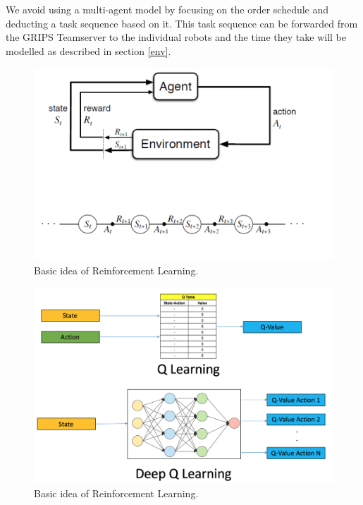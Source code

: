 \documentclass[runningheads,envcountsect]{llncs}
\begin{document}
We avoid using a multi-agent model by focusing on the order schedule and deducting a task sequence based on it. This task sequence can be forwarded from the GRIPS Teamserver to the individual robots and the time they take will be modelled as described in section \ref{env}.

\begin{figure}[h!]
  \centering
  \includegraphics[scale=0.7]{img/rl_base.png}
  \caption{Basic idea of Reinforcement Learning.}
  \label{fig:rl}
\end{figure}

\begin{figure}[h!]
  \centering
  \includegraphics[scale=0.5]{img/dql.png}
  \caption{Basic idea of Reinforcement Learning.}
  \label{fig:dql}
\end{figure}
\end{document}
